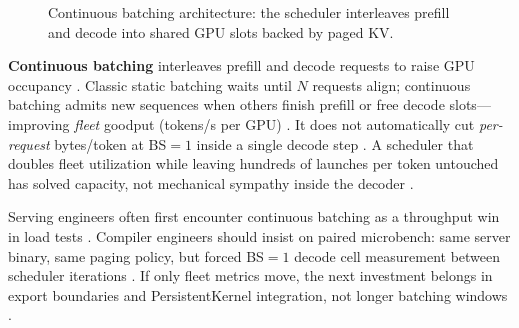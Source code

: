 \begin{figure}[t]
\centering
{}
\caption{Continuous batching architecture: the scheduler interleaves prefill and decode into shared GPU slots backed by paged KV.}
\label{fig:continuous_batching_architecture}
\end{figure}

\textbf{Continuous batching} interleaves prefill and decode requests to raise GPU occupancy \citep{kwon2023vllm,patel2025llminference,liu2024deepseekv3,dlbook}. Classic static batching waits until $N$ requests align; continuous batching admits new sequences when others finish prefill or free decode slots---improving \emph{fleet} goodput (tokens/s per GPU) \citep{kwon2023vllm,patel2025llminference,memoryfloor2026}. It does not automatically cut \emph{per-request} bytes/token at BS${=}1$ inside a single decode step \citep{taxbreak2026,memoryfloor2026,patel2025llminference,yirage2026,chen2020compilerbasedhardw}. A scheduler that doubles fleet utilization while leaving hundreds of launches per token untouched has solved capacity, not mechanical sympathy inside the decoder \citep{taxbreak2026,kwon2023vllm,patel2025llminference,memoryfloor2026,yirage2026,chen2020compilerbasedhardw,dlbook}.

Serving engineers often first encounter continuous batching as a throughput win in load tests \citep{kwon2023vllm,patel2025llminference,dlbook,memoryfloor2026,taxbreak2026,yirage2026,chen2020compilerbasedhardw,liu2024deepseekv3,nvidia2024cudagraphs,dao2022flashattention,semianalysis2024tma,amd2024xdna,amd2024aie,dlbook}. Compiler engineers should insist on paired microbench: same server binary, same paging policy, but forced BS${=}1$ decode cell measurement between scheduler iterations \citep{taxbreak2026,memoryfloor2026,patel2025llminference,yirage2026,chen2020compilerbasedhardw,kwon2023vllm,dlbook}. If only fleet metrics move, the next investment belongs in export boundaries and PersistentKernel integration, not longer batching windows \citep{yirage2026,chen2020compilerbasedhardw,nvidia2024cudagraphs,kwon2023vllm,patel2025llminference,taxbreak2026,memoryfloor2026,dlbook}.

